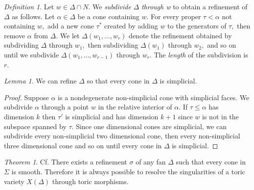 \documentclass[BSc]{usydthesis}
\numberwithin{equation}{chapter}
\theoremstyle{remark}
\newtheorem{Definition}[equation]{Definition}
\newtheorem{Theorem}[equation]{Theorem}
\newtheorem{Lemma}[equation]{Lemma}
\begin{document}
\begin{Definition}
 Let $w\in \Delta \cap N.$ We {\em subdivide} $\Delta$ {\em through w} to obtain a refinement of $\Delta$ as follows. Let $\alpha \in \Delta$ be a cone containing $w.$ For every proper $\tau < \alpha$ not containing $w,$ add a new cone $\tau^*$ created by adding $w$ to the generators of $\tau,$ then remove $\alpha$ from $\Delta.$ We let $\Delta(w_1, \ldots, w_r)$ denote the refinement obtained by subdividing $\Delta$ through $w_1,$ then subdividing $\Delta(w_1)$ through $w_2,$ and so on until we subdivide $\Delta(w_1,\ldots, w_{r-1})$ through $w_r.$ The {\em length} of the subdivision is $r.$
\end{Definition}
\begin{Lemma}\label{PY} We can refine $\Delta$ so that every cone in $\Delta$ is simplicial.
\end{Lemma}
\begin{proof}
 Suppose $\alpha$ is a nondegenerate non-simplicial cone with simplicial faces. We subdivide $\alpha$ through a point $w$ in the relative interior of $\alpha.$ If $\tau \leq \alpha$ has dimension $k$ then $\tau'$ is simplicial and has dimension $k+1$ since $w$ is not in the subspace spanned by $\tau.$ Since one dimensional cones are simplicial, we can subdivide every non-simplicial two dimensional cone, then every non-simplicial three dimensional cone and so on until every cone in $\Delta$ is simplicial. 
\end{proof}
\begin{Theorem} Cf. \cite[Exercise on Page.~ 48]{Fulton:Toric}
 There exists a refinement $\sigma$ of any fan $\Delta$ such that every cone in $\Sigma$ is smooth. Therefore it is always possible to resolve the singularities of a toric variety $X(\Delta)$ through toric morphisms. 
\end{Theorem}
\end{document}
